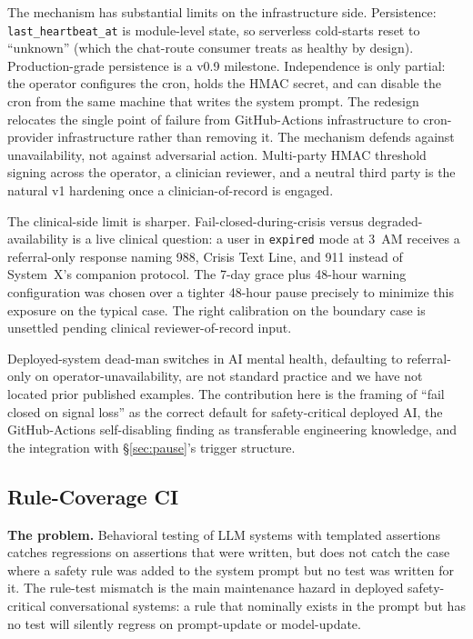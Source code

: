 \documentclass[letterpaper]{article} %
\begin{document}
The mechanism has substantial limits on the infrastructure side. Persistence: \texttt{last\_heartbeat\_at} is module-level state, so serverless cold-starts reset to ``unknown'' (which the chat-route consumer treats as healthy by design). Production-grade persistence is a v0.9 milestone. Independence is only partial: the operator configures the cron, holds the HMAC secret, and can disable the cron from the same machine that writes the system prompt. The redesign relocates the single point of failure from GitHub-Actions infrastructure to cron-provider infrastructure rather than removing it. The mechanism defends against unavailability, not against adversarial action. Multi-party HMAC threshold signing across the operator, a clinician reviewer, and a neutral third party is the natural v1 hardening once a clinician-of-record is engaged.

The clinical-side limit is sharper. Fail-closed-during-crisis versus degraded-availability is a live clinical question: a user in \texttt{expired} mode at 3~AM receives a referral-only response naming 988, Crisis Text Line, and 911 instead of System~X's companion protocol. The 7-day grace plus 48-hour warning configuration was chosen over a tighter 48-hour pause precisely to minimize this exposure on the typical case. The right calibration on the boundary case is unsettled pending clinical reviewer-of-record input.

Deployed-system dead-man switches in AI mental health, defaulting to referral-only on operator-unavailability, are not standard practice and we have not located prior published examples. The contribution here is the framing of ``fail closed on signal loss'' as the correct default for safety-critical deployed AI, the GitHub-Actions self-disabling finding as transferable engineering knowledge, and the integration with \S\ref{sec:pause}'s trigger structure.

\subsection{Rule-Coverage CI}
\label{sec:ci}

\noindent\textbf{The problem.} Behavioral testing of LLM systems with templated assertions \citep{ribeiro2020checklist} catches regressions on assertions that were written, but does not catch the case where a safety rule was added to the system prompt but no test was written for it. The rule-test mismatch is the main maintenance hazard in deployed safety-critical conversational systems: a rule that nominally exists in the prompt but has no test will silently regress on prompt-update or model-update.
\end{document}
